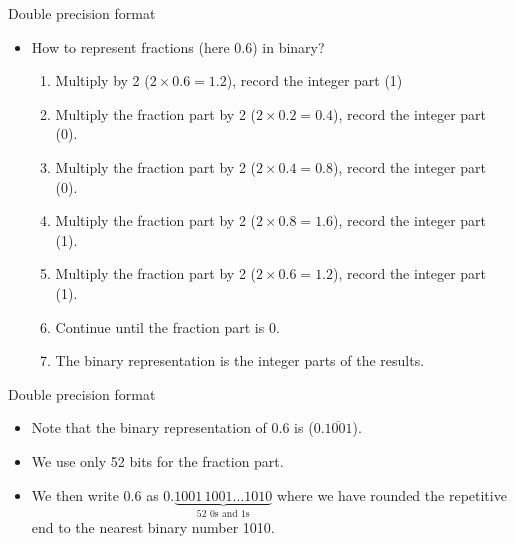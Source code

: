 \documentclass[11pt,xcolor={dvipsnames},aspectratio=159,hyperref={pdftex,pdfpagemode=UseNone,hidelinks,pdfdisplaydoctitle=true},usepdftitle=false]{beamer}
\begin{document}
\begin{frame}{Double precision format}
    \begin{itemize}
    
        \item How to represent fractions (here 0.6) in binary?
        \begin{enumerate} \item Multiply by 2 ($2\times 0.6 = 1.2$), record the integer part (1)
        \item Multiply the fraction part by 2 ($2\times 0.2 = 0.4$), record the integer part (0).
        \item Multiply the fraction part by 2 ($2\times 0.4 = 0.8$), record the integer part (0).
        \item Multiply the fraction part by 2 ($2\times 0.8 = 1.6$), record the integer part (1).
        \item Multiply the fraction part by 2 ($2\times 0.6 = 1.2$), record the integer part (1).
        \item Continue until the fraction part is 0. 
        \item The binary representation is the integer parts of the results.
        \end{enumerate}
       
    \end{itemize}
\end{frame}

\begin{frame}{Double precision format}
    \begin{itemize}
    
        \item Note that the binary representation of 0.6 is  ($0.\overline{1001}$).
        \item We use only 52 bits for the fraction part.
        \item We then write $0.6$ as $0.\underbrace{1001\,1001 \ldots 
        1010}_{52 \text{ 0s and 1s}}$ where we have rounded the repetitive end to the nearest binary
        number 1010.
    \end{itemize}
\end{frame}
\end{document}
